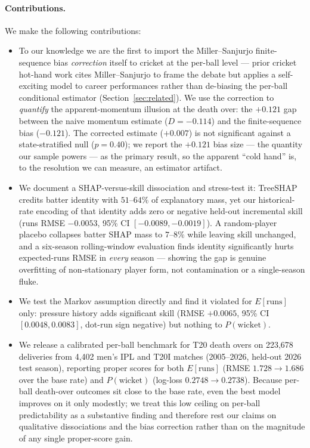 \paragraph{Contributions.} We make the following contributions:
\begin{itemize}
  \item To our knowledge we are the first to import the Miller--Sanjurjo
        finite-sequence bias \emph{correction} itself to cricket at the per-ball
        level --- prior cricket hot-hand work \citep{ram2022hothand} cites
        Miller--Sanjurjo to frame the debate but applies a self-exciting model to
        career performances rather than de-biasing the per-ball conditional
        estimator (Section~\ref{sec:related}). We use the correction to
        \emph{quantify} the apparent-momentum illusion at the death over: the
        $+0.121$ gap between the naive momentum estimate ($D=-0.114$) and the
        finite-sequence bias ($-0.121$). The corrected estimate ($+0.007$) is not
        significant against a state-stratified null ($p=0.40$); we report the
        $+0.121$ bias size --- the quantity our sample powers --- as the primary
        result, so the apparent ``cold hand'' is, to the resolution we can measure,
        an estimator artifact.
  \item We document a SHAP-versus-skill dissociation and stress-test it: TreeSHAP
        credits batter identity with $51$--$64\%$ of explanatory mass, yet our
        historical-rate encoding of that identity adds zero or negative held-out
        incremental skill (runs RMSE $-0.0053$, 95\%
        CI $[-0.0089, -0.0019]$). A random-player placebo collapses batter SHAP mass
        to $7$--$8\%$ while leaving skill unchanged, and a six-season rolling-window
        evaluation finds identity significantly hurts expected-runs RMSE in
        \emph{every} season --- showing the gap is genuine overfitting of
        non-stationary player form, not contamination or a single-season fluke.
  \item We test the Markov assumption directly and find it violated for
        $E[\text{runs}]$ only: pressure history adds significant skill (RMSE
        $+0.0065$, 95\% CI $[0.0048, 0.0083]$, dot-run sign negative) but nothing
        to $P(\text{wicket})$.
  \item We release a calibrated per-ball benchmark for T20 death overs on
        223{,}678 deliveries from 4{,}402 men's IPL and T20I matches
        (2005--2026, held-out 2026 test season), reporting proper scores for
        both $E[\text{runs}]$ (RMSE $1.728 \to 1.686$ over the base rate) and
        $P(\text{wicket})$ (log-loss $0.2748 \to 0.2738$). Because per-ball
        death-over outcomes sit close to the base rate, even the best model improves
        on it only modestly; we treat this low ceiling on per-ball predictability as
        a substantive finding and therefore rest our claims on qualitative
        dissociations and the bias correction rather than on the magnitude of any
        single proper-score gain.
\end{itemize}

